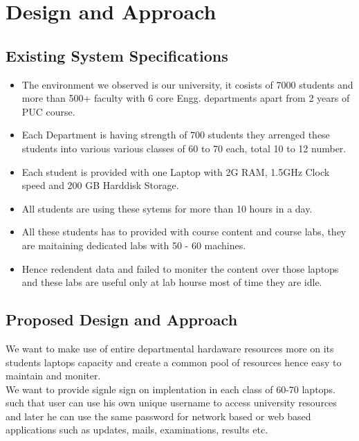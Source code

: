 \documentclass[12pt]{report}
\begin{document}
\chapter{Design and Approach}

\section{Existing System Specifications}


\begin{itemize}
	\item The environment we observed is our university, it cosists of 7000 students and more than 500+ faculty with 6 core Engg. departments apart from 2 years of PUC course.
	\item Each Department is having strength of 700 students they arrenged these students into various various classes of 60 to 70 each, total 10 to 12 number. 
	\item Each student is provided with one Laptop with 2G RAM, 1.5GHz Clock speed and 200 GB Harddisk Storage. 
	\item All students are using these sytems for more than 10 hours in a day.
	\item All these students has to provided with course content and course labs, they are maitaining dedicated labs with 50 - 60 machines.
	\item Hence redendent data and failed to moniter the content over those laptops and these labs are useful only at lab hourse most of time they are idle.
\end{itemize}	

\section{Proposed Design and Approach}

	We want to make use of entire departmental hardaware resources more on its students laptops capacity and create a common pool of resources hence easy to maintain and moniter.\\
	
	We want to provide signle sign on implentation in each class of 60-70 laptops. such that user can use his own unique username to access university resources and later he can use the same password for network based or web based applications such as updates, mails, examinations, results etc.\newline
	
\end{document}
